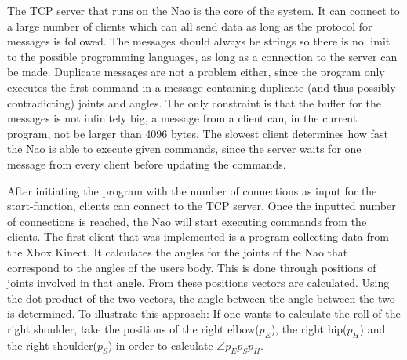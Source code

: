 \documentclass[11pt,a4paper,oneside]{article}
\begin{document}
The TCP server that runs on the Nao is the core of the system. It can connect to a large number of clients which can all send data as long as the protocol for messages is followed. The messages should always be strings so there is no limit to the possible programming languages, as long as a connection to the server can be made. Duplicate messages are not a problem either, since the program only executes the first command in a message containing duplicate (and thus possibly contradicting) joints and angles. The only constraint is that the buffer for the messages is not infinitely big, a message from a client can, in the current program, not be larger than 4096 bytes. The slowest client determines how fast the Nao is able to execute given commands, since the server waits for one message from every client before updating the commands.

After initiating the program with the number of connections as input for the start-function, clients can connect to the TCP server. Once the inputted number of connections is reached, the Nao will start executing commands from the clients.
The first client that was implemented is a program collecting data from the Xbox Kinect. It calculates the angles for the joints of the Nao that correspond to the angles of the users body. This is done through positions of joints involved in that angle. From these positions vectors are calculated. Using the dot product of the two vectors, the angle between the angle between the two is determined.
To illustrate this approach: If one wants to calculate the roll of the right shoulder, take the positions of the right elbow($p_{E}$), the right hip($p_{H}$) and the right shoulder($p_{S}$) in order to calculate $\angle p_{E}p_{S}p_{H}$.
\end{document}
